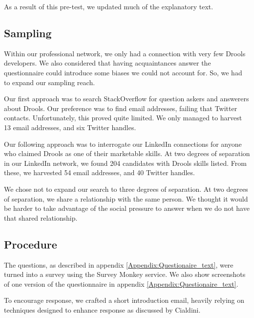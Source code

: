 As a result of this pre-test, we updated much of the explanatory text.

\subsection{Sampling}
Within our professional network, we only had a connection with very few Drools developers.
We also considered that having acquaintances answer the questionnaire could introduce some biases we could not account for.
So, we had to expand our sampling reach.

Our first approach was to search StackOverflow for question askers and answerers about Drools.
Our preference was to find email addresses, failing that Twitter contacts.
Unfortunately, this proved quite limited.
We only managed to harvest 13 email addresses, and six Twitter handles.

Our following approach was to interrogate our LinkedIn connections for anyone who claimed Drools as one of their marketable skills.
At two degrees of separation in our LinkedIn network, we found 204 candidates with Drools skills listed.
From these, we harvested 54 email addresses, and 40 Twitter handles.

We chose not to expand our search to three degrees of separation.
At two degrees of separation, we share a relationship with the same person.
We thought it would be harder to take advantage of the social pressure to answer when we do not have that shared relationship.

\subsection{Procedure}

The questions, as described in appendix \ref{Appendix:Questionaire_text}, were turned into a survey using the Survey Monkey service.
We also show screenshots of one version of the questionnaire in appendix \ref{Appendix:Questionaire_text}.

To encourage response, we crafted a short introduction email, heavily relying on techniques designed to enhance response as discussed by  Cialdini\cite{goldstein2008yes}.
